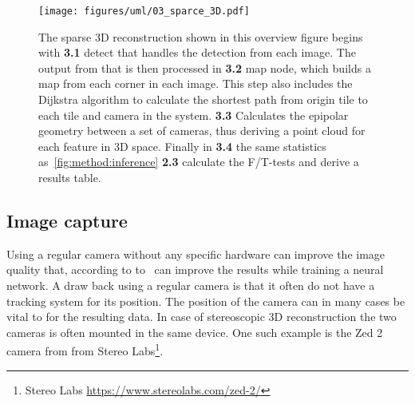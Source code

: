 \begin{figure}
    \begin{center}
        \texttt{[image: figures/uml/03\_sparce\_3D.pdf]}
    \end{center}
    \caption{The sparse 3D reconstruction shown in this overview figure begins with \textbf{3.1} detect that handles the \aruco{ } detection from each image.
        The output from that is then processed in \textbf{3.2} map node, which builds a map from each corner in each image. This step also includes the Dijkstra algorithm to calculate the shortest path from \aruco{ } origin tile to each tile and camera in the system.
        \textbf{3.3} Calculates the epipolar geometry between a set of cameras, thus deriving a point cloud for each feature in 3D space.
        Finally in \textbf{3.4} the same statistics as~\ref{fig:method:inference} \textbf{2.3} calculate the F/T-tests and derive a results table.
    }\label{fig:method:sparce3d}
\end{figure}





\subsection{Image capture}%
\label{sub:Image_capture}
Using a regular camera without any specific hardware can improve the image quality that, according to to~\cite{jeelani2018image} can improve the results while training a neural network.
A draw back using a regular camera is that it often do not have a tracking system for its position.
The position of the camera can in many cases be vital to for the resulting data.
In case of stereoscopic 3D reconstruction the two cameras is often mounted in the same device.
One such example is the Zed 2 camera from from Stereo Labs\footnote{Stereo Labs \url{https://www.stereolabs.com/zed-2/}}.




